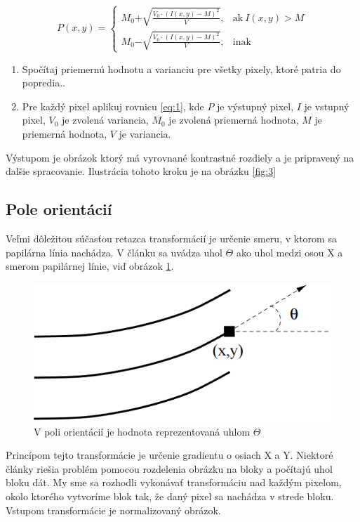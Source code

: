\documentclass[11pt,a4paper]{article}
\begin{document}
 \begin{equation}
P(x,y) =
\begin{cases}
M_0 \boldsymbol {+} \sqrt{\frac{V_0 \cdot (I(x,y) -M )^2 }{V}}, & \text{ak}\ I(x,y)>M \\
M_0 \boldsymbol {-} \sqrt{\frac{V_0 \cdot (I(x,y) -M )^2 }{V}}, & \text{inak}
\end{cases}
\label{eq:1}
\end{equation}

\begin{enumerate}
	\item Spočítaj priemernú hodnotu a varianciu pre všetky pixely, ktoré patria do popredia..
	\item Pre každý pixel aplikuj rovnicu \ref{eq:1}, kde $P$ je výstupný pixel, $I$ je vstupný pixel, $V_0$ je zvolená variancia, $M_0$ je zvolená priemerná hodnota,  $M$ je priemerná hodnota,  $V$ je variancia.
\end{enumerate}

Výstupom je obrázok ktorý má vyrovnané kontrastné rozdiely a je pripravený na dalšie spracovanie.
Ilustrácia tohoto kroku je na obrázku \ref{fig:3}














\subsection*{Pole orientácií}
Veľmi dôležitou súčasťou retazca transformácií je určenie smeru, v ktorom sa papilárna línia nachádza. V článku \cite{thai} sa uvádza uhol $\Theta$ ako uhol medzi osou X a smerom papilárnej línie, viď obrázok \ref{fig:4}.

\begin{figure}[h]
	\centering
	\includegraphics[width=.4\linewidth]{images/Screenshot_9}
	\caption{V poli orientácií je hodnota reprezentovaná uhlom $\Theta$}
	\label{fig:4}
\end{figure}

Princípom tejto transformácie je určenie gradientu o osiach X a Y. Niektoré články riešia problém pomocou rozdelenia obrázku na bloky a počítajú uhol bloku dát. My sme sa rozhodli vykonávať transformáciu nad každým pixelom, okolo ktorého vytvoríme blok tak, že daný pixel sa nachádza v strede bloku. Vstupom transformácie je normalizovaný obrázok.
\end{document}
